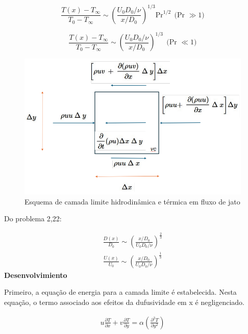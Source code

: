 \documentclass[12pt]{article}
\begin{document}
\begin{equation}
	\frac{T(x) - T_\infty}{T_0 - T_\infty} \sim \left( \frac{U_0 D_0 / \nu}{x / D_0} \right)^{1/3} \text{Pr}^{1/2} \ \ \text{(Pr } \gg 1 \text{)}
\end{equation}


\begin{equation}
	\frac{T(x) - T_\infty}{T_0 - T_\infty} \sim \left( \frac{U_0 D_0 / \nu}{x / D_0} \right)^{1/3} \ \ \text{(Pr } \ll 1 \text{)}
\end{equation}

 
\begin{figure}[H]
	\centering
	\includegraphics[width=.65\textwidth]{Figures/1_2}
	\caption{Esquema de camada limite hidrodinâmica e térmica em fluxo de jato}
\end{figure}

Do problema 2,22:

\begin{equation}
	\begin{aligned}
		\frac{D(x)}{D_{0}} \sim \left( \frac{x/D_{0}}{U_{0}D_{0}/\nu} \right) ^{\frac{2}{3}}
	\end{aligned}	
\end{equation}
\begin{equation}
	\begin{aligned}
		\frac{U(x)}{U_{0}} \sim \left( \frac{x/D_{0}}{U_{0}D_{0}/\nu} \right) ^{\frac{1}{3}}
	\end{aligned}	
\end{equation}
\textbf{Desenvolvimiento}

Primeiro, a equação de energia para a camada limite é estabelecida. Nesta equação, o termo associado aos efeitos da dufusividade em x é negligenciado.

\begin{equation}
	\begin{aligned}
		u\frac{\partial T}{\partial x} + v\frac{\partial T}{\partial y} = \alpha\left( \frac{\partial^{2} T}{\partial y^{2}}\right)
	\end{aligned}
\end{equation}
\end{document}
